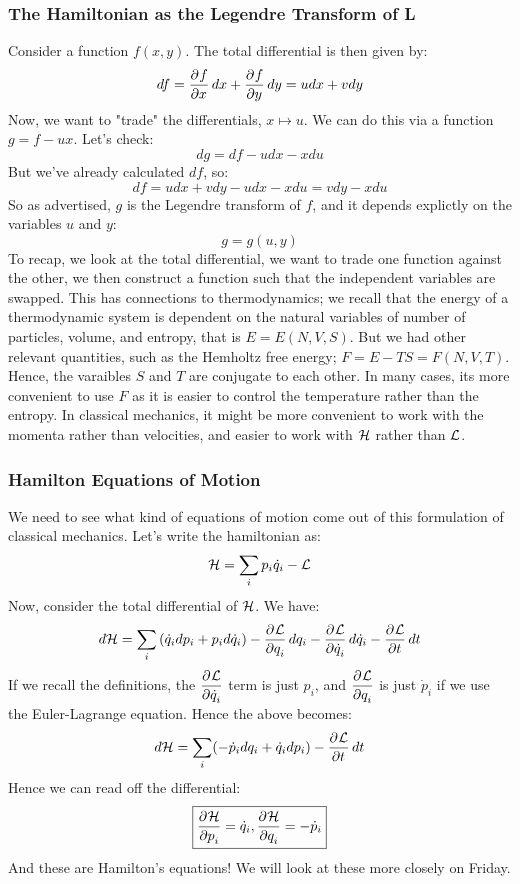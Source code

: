 \subsubsection{The Hamiltonian as the Legendre Transform of L}
Consider a function $f(x,y)$. The total differential is then given by:
\[df = \dpd{f}{x}dx + \dpd{f}{y}dy  = udx + vdy\]
Now, we want to "trade" the differentials, $x \mapsto u$. We can do this via a function $g = f - ux$. Let's check:
\[dg = df - udx - xdu\]
But we've already calculated $df$, so:
\[df = udx + vdy - udx - xdu = vdy - xdu\]
So as advertised, $g$ is the Legendre transform of $f$, and it depends explictly on the variables $u$ and $y$:
\[g = g(u, y)\]
To recap, we look at the total differential, we want to trade one function against the other, we then construct a function such that the independent variables are swapped. This has connections to thermodynamics; we recall that the energy of a thermodynamic system is dependent on the natural variables of number of particles, volume, and entropy, that is $E = E(N, V, S)$. But we had other relevant quantities, such as the Hemholtz free energy; $F = E - TS = F(N, V, T)$. Hence, the varaibles $S$ and $T$ are conjugate to each other. In many cases, its more convenient to use $F$ as it is easier to control the temperature rather than the entropy. In classical mechanics, it might be more convenient to work with the momenta rather than velocities, and easier to work with $\mathcal{H}$ rather than $\mathcal{L}$. 

\subsubsection{Hamilton Equations of Motion}
We need to see what kind of equations of motion come out of this formulation of classical mechanics. Let's write the hamiltonian as:
\[\mathcal{H} = \sum_i p_i\dot{q}_i - \mathcal{L}\]
Now, consider the total differential of $\mathcal{H}$. We have:
\[d\HH = \sum_i \left(\dot{q}_i dp_i + p_i d\dot{q}_i\right) - \dpd{\LL}{q_i}dq_i - \dpd{\LL}{\dot{q}_i}d\dot{q}_i - \dpd{\LL}{t}dt\]
If we recall the definitions, the $\dpd{\LL}{\dot{q}_i}$ term is just $p_i$, and $\dpd{\LL}{q_i}$ is just $\dot{p}_i$ if we use the Euler-Lagrange equation. Hence the above becomes:
\[d\HH = \sum_i (-\dot{p}_idq_i + \dot{q}_idp_i) - \dpd{\LL}{t}dt\]
Hence we can read off the differential:
\[\boxed{\dpd{\HH}{p_i} = \dot{q}_i, \dpd{\HH}{q_i} = -\dot{p}_i}\]
And these are Hamilton's equations! We will look at these more closely on Friday.